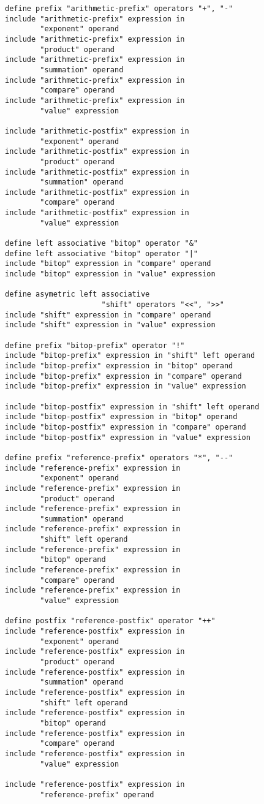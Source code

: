\documentclass[12pt]{article}
\newenvironment{indpar}[1][0.3in]%
	{\begin{list}{}%
		     {\setlength{\itemsep}{0in}%
		      \setlength{\topsep}{0in}%
		      \setlength{\parsep}{1ex}%
		      \setlength{\labelwidth}{#1}%
		      \setlength{\leftmargin}{#1}%
		      \addtolength{\leftmargin}{\labelsep}}%
	 \item}%
	{\end{list}}
\begin{document}
\begin{indpar}
\begin{verbatim}
define prefix "arithmetic-prefix" operators "+", "-"
include "arithmetic-prefix" expression in
        "exponent" operand
include "arithmetic-prefix" expression in
        "product" operand
include "arithmetic-prefix" expression in
        "summation" operand
include "arithmetic-prefix" expression in
        "compare" operand
include "arithmetic-prefix" expression in
        "value" expression

include "arithmetic-postfix" expression in
        "exponent" operand
include "arithmetic-postfix" expression in
        "product" operand
include "arithmetic-postfix" expression in
        "summation" operand
include "arithmetic-postfix" expression in
        "compare" operand
include "arithmetic-postfix" expression in
        "value" expression

define left associative "bitop" operator "&"
define left associative "bitop" operator "|"
include "bitop" expression in "compare" operand
include "bitop" expression in "value" expression

define asymetric left associative
                      "shift" operators "<<", ">>"
include "shift" expression in "compare" operand
include "shift" expression in "value" expression

define prefix "bitop-prefix" operator "!"
include "bitop-prefix" expression in "shift" left operand
include "bitop-prefix" expression in "bitop" operand
include "bitop-prefix" expression in "compare" operand
include "bitop-prefix" expression in "value" expression

include "bitop-postfix" expression in "shift" left operand
include "bitop-postfix" expression in "bitop" operand
include "bitop-postfix" expression in "compare" operand
include "bitop-postfix" expression in "value" expression

define prefix "reference-prefix" operators "*", "--"
include "reference-prefix" expression in
        "exponent" operand
include "reference-prefix" expression in
        "product" operand
include "reference-prefix" expression in
        "summation" operand
include "reference-prefix" expression in
        "shift" left operand
include "reference-prefix" expression in
        "bitop" operand
include "reference-prefix" expression in
        "compare" operand
include "reference-prefix" expression in
        "value" expression

define postfix "reference-postfix" operator "++"
include "reference-postfix" expression in
        "exponent" operand
include "reference-postfix" expression in
        "product" operand
include "reference-postfix" expression in
        "summation" operand
include "reference-postfix" expression in
        "shift" left operand
include "reference-postfix" expression in
        "bitop" operand
include "reference-postfix" expression in
        "compare" operand
include "reference-postfix" expression in
        "value" expression

include "reference-postfix" expression in
        "reference-prefix" operand
\end{verbatim}\end{indpar}
\end{document}
